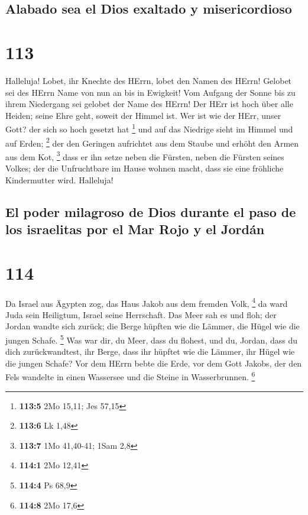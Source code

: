 \hypertarget{alabado-sea-el-dios-exaltado-y-misericordioso}{%
\subsection{Alabado sea el Dios exaltado y
misericordioso}\label{alabado-sea-el-dios-exaltado-y-misericordioso}}

\hypertarget{section-112}{%
\section{113}\label{section-112}}

 Halleluja! Lobet, ihr Knechte des HErrn, lobet den Namen
des HErrn!  Gelobet sei des HErrn Name von nun an bis in
Ewigkeit!  Vom Aufgang der Sonne bis zu ihrem Niedergang
sei gelobet der Name des HErrn!  Der HErr ist hoch über
alle Heiden; seine Ehre geht, soweit der Himmel ist.  Wer
ist wie der HErr, unser Gott? der sich so hoch gesetzt hat \footnote{\textbf{113:5}
  2Mo 15,11; Jes 57,15}  und auf das Niedrige sieht im
Himmel und auf Erden; \footnote{\textbf{113:6} Lk 1,48} 
der den Geringen aufrichtet aus dem Staube und erhöht den Armen aus dem
Kot, \footnote{\textbf{113:7} 1Mo 41,40-41; 1Sam 2,8} 
dass er ihn setze neben die Fürsten, neben die Fürsten seines Volkes;
 der die Unfruchtbare im Hause wohnen macht, dass sie eine
fröhliche Kindermutter wird. Halleluja!

\hypertarget{el-poder-milagroso-de-dios-durante-el-paso-de-los-israelitas-por-el-mar-rojo-y-el-jorduxe1n}{%
\subsection{El poder milagroso de Dios durante el paso de los israelitas
por el Mar Rojo y el
Jordán}\label{el-poder-milagroso-de-dios-durante-el-paso-de-los-israelitas-por-el-mar-rojo-y-el-jorduxe1n}}

\hypertarget{section-113}{%
\section{114}\label{section-113}}

 Da Israel aus Ägypten zog, das Haus Jakob aus dem fremden
Volk, \footnote{\textbf{114:1} 2Mo 12,41}  da ward Juda
sein Heiligtum, Israel seine Herrschaft.  Das Meer sah es
und floh; der Jordan wandte sich zurück;  die Berge
hüpften wie die Lämmer, die Hügel wie die jungen Schafe. \footnote{\textbf{114:4}
  Ps 68,9}  Was war dir, du Meer, dass du flohest, und du,
Jordan, dass du dich zurückwandtest,  ihr Berge, dass ihr
hüpftet wie die Lämmer, ihr Hügel wie die jungen Schafe? 
Vor dem HErrn bebte die Erde, vor dem Gott Jakobs,  der
den Fels wandelte in einen Wassersee und die Steine in Wasserbrunnen.
\footnote{\textbf{114:8} 2Mo 17,6}

